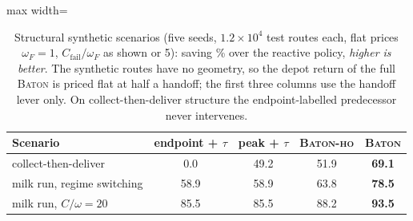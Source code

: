 \begin{table}[t]
\caption{Structural synthetic scenarios (five seeds, $1.2\times10^4$ test
routes each, flat prices $\omega_F = 1$, $C_{\mathrm{fail}}/\omega_F$
as shown or 5): saving \% over the reactive policy, \emph{higher is
better}. The synthetic routes have no geometry, so the depot return of
the full \textsc{Baton} is priced flat at half a handoff; the first
three columns use the handoff lever only. On collect-then-deliver
structure the endpoint-labelled predecessor never intervenes.}
\label{tab:synthetic}
\centering
\begin{adjustbox}{max width=\linewidth}
\begin{tabular}{l cccc}
\toprule
Scenario & endpoint + $\tau$ & peak + $\tau$ & \textsc{Baton-ho} &
\textsc{Baton} \\
\midrule
collect-then-deliver & 0.0 & 49.2 & 51.9 & \textbf{69.1} \\
milk run, regime switching & 58.9 & 58.9 & 63.8 & \textbf{78.5} \\
milk run, $C/\omega = 20$ & 85.5 & 85.5 & 88.2 & \textbf{93.5} \\
\bottomrule
\end{tabular}
\end{adjustbox}
\end{table}
